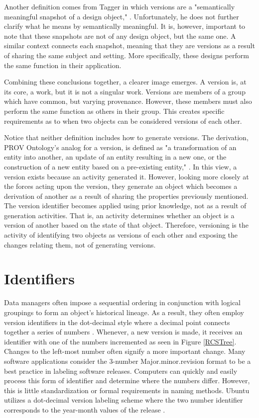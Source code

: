 Another definition comes from Tagger in which versions are a "semantically meaningful snapshot of a design object," \cite{Tagger2005}.
Unfortunately, he does not further clarify what he means by semantically meaningful.
It is, however, important to note that these snapshots are not of any design object, but the same one.
A similar context connects each snapshot, meaning that they are versions as a result of sharing the same subject and setting.
More specifically, these designs perform the same function in their application.

Combining these conclusions together, a clearer image emerges.
A version is, at its core, a work, but it is not a singular work.
Versions are members of a group which have common, but varying provenance.
However, these members must also perform the same function as others in their group.
This creates specific requirements as to when two objects can be considered versions of each other.

Notice that neither definition includes how to generate versions.
The derivation, PROV Ontology's analog for a version, is defined as "a transformation of an entity into another, an update of an entity resulting in a new one, or the construction of a new entity based on a pre-existing entity," \cite{Lebo2013}.
In this view, a version exists because an activity generated it.
However, looking more closely at the forces acting upon the version, they generate an object which becomes a derivation of another as a result of sharing the properties previously mentioned.
The version identifier becomes applied using prior knowledge, not as a result of generation activities.
That is, an activity determines whether an object is a version of another based on the state of that object.
Therefore, versioning is the activity of identifying two objects as versions of each other and exposing the changes relating them, not of generating versions.

\section{Identifiers}

Data managers often impose a sequential ordering in conjunction with logical groupings to form an object's historical lineage.
As a result, they often employ version identifiers in the dot-decimal style where a decimal point connects together a series of numbers \cite{Stuckenholz:2005:CEV:1039174.1039197}.
Whenever, a new version is made, it receives an identifier with one of the numbers incremented as seen in Figure \ref{RCSTree}.
Changes to the left-most number often signify a more important change.
Many software applications consider the 3-number Major.minor.revision format to be a best practice in labeling software releases.
Computers can quickly and easily process this form of identifier and determine where the numbers differ.
However, this is little standardization or formal requirements in naming methods.
Ubuntu utilizes a dot-decimal version labeling scheme where the two number identifier corresponds to the year-month values of the release \cite{Ubuntu}.


